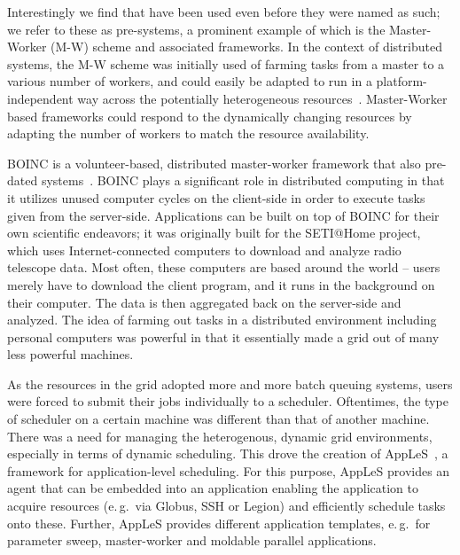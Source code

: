 \documentclass{sig-alternate}
\begin{document}
Interestingly we find that \pilotjobs have been used even before they
were named as such; we refer to these as pre-\pilotjob systems, a
prominent example of which is the Master-Worker (M-W) scheme and
associated frameworks.  In the context of distributed systems, the M-W
scheme was initially used of farming tasks from a master to a various
number of workers, and could easily be adapted to run in a
platform-independent way across the potentially heterogeneous
resources~\cite{masterworker, Goux00anenabling}. Master-Worker based
frameworks could respond to the dynamically changing resources by
adapting the number of workers to match the resource availability.


BOINC is a volunteer-based, distributed master-worker framework that
also pre-dated \pilotjob
systems~\cite{Anderson:2004:BSP:1032646.1033223}. BOINC plays a
significant role in distributed computing in that it utilizes unused
computer cycles on the client-side in order to execute tasks given
from the server-side. Applications can be built on top of BOINC for
their own scientific endeavors; it was originally built for the
SETI@Home project, which uses Internet-connected computers to download
and analyze radio telescope data. Most often, these computers are
based around the world -- users merely have to download the client
program, and it runs in the background on their computer. The data is
then aggregated back on the server-side and analyzed. The idea of
farming out tasks in a distributed environment including personal
computers was powerful in that it essentially made a grid out of many
less powerful machines.

As the resources in the grid adopted more and more batch queuing
systems, users were forced to submit their jobs individually to a
scheduler. Oftentimes, the type of scheduler on a certain machine was
different than that of another machine. There was a need for managing
the heterogenous, dynamic grid environments, especially in terms of
dynamic scheduling. This drove the creation of
AppLeS~\cite{Berman:2003:ACG:766629.766632}, a framework for
application-level scheduling. For this purpose, AppLeS provides an
agent that can be embedded into an application enabling the
application to acquire resources (e.\,g.\ via Globus, SSH or Legion)
and efficiently schedule tasks onto these. Further, AppLeS provides
different application templates, e.\,g.\ for parameter sweep,
master-worker and moldable parallel applications.
\end{document}
